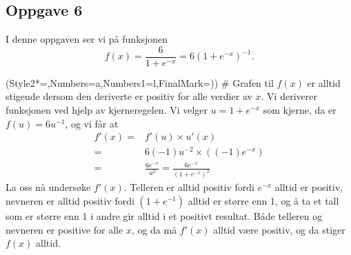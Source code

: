 \subsection*{Oppgave 6}
I denne oppgaven ser vi på funksjonen
\begin{equation*}
	f(x) = \frac{6}{1 + e^{-x}} = 6 \left( 1 + e^{-x} \right)^{-1}.
\end{equation*}
\begin{easylist}[enumerate]
	\ListProperties(Style2*=,Numbers=a,Numbers1=l,FinalMark={)})
	# Grafen til $f(x)$ er alltid stigende dersom den deriverte er positiv for alle verdier av $x$.
	Vi deriverer funksjonen ved hjelp av kjerneregelen. Vi velger $u = 1 + e^{-x}$ som kjerne, da er $f(u) = 6u^{-1}$, og vi får at
	\begin{align*}
		f'(x) =& f'(u) \times u'(x) \\
		=& 6(-1)u^{-2} \times \left((-1) e^{-x}\right) \\
		=& \frac{6e^{-x}}{u^2} = \frac{6e^{-x}}{\left(1 + e^{-x}\right)^2}
	\end{align*}
	La oss nå undersøke $f'(x)$.
	Telleren er alltid positiv fordi $e^{-x}$ alltid er positiv, nevneren er alltid positiv fordi $(1 + e^{-1})$ alltid er større enn 1, og å ta et tall som er større enn 1 i andre gir alltid i et positivt resultat.
	Både telleren og nevneren er positive for alle $x$, og da må $f'(x)$ alltid være positiv, og da stiger $f(x)$ alltid.


\end{easylist}
